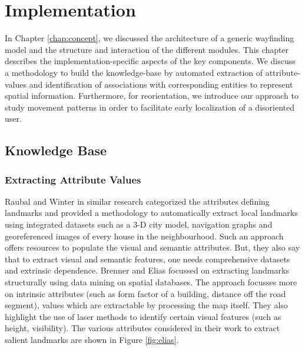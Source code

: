 \documentclass{iitkthesis}
\begin{document}
 \chapter{Implementation}
 \label{chap:implement}
In Chapter \ref{chap:concept}, we discussed the 
architecture of a generic wayfinding model and the structure and interaction 
of the different modules. This chapter describes the implementation-specific 
aspects of the key components. We discuss a methodology to build the 
knowledge-base by automated extraction of attribute-values and 
identification of associations with corresponding entities to 
represent spatial information. Furthermore, for reorientation, 
we introduce our approach to study movement patterns in order to 
facilitate early localization of a disoriented user.

 \section{Knowledge Base}
  \label{sec:kbase}
\subsection{Extracting Attribute Values}
Raubal and Winter \cite{raubal} in similar research categorized
the attributes defining landmarks and provided a methodology to 
automatically extract local landmarks using integrated datasets such as a
3-D city model, navigation graphs and georeferenced images of every house 
in the neighbourhood. Such an approach offers resources to populate the 
visual and semantic attributes. But, they also say that to extract 
visual and semantic features, one needs comprehensive datasets and 
extrinsic dependence.  Brenner and Elias \cite{brenner} focussed on 
extracting landmarks structurally using data mining on spatial 
databases. The approach focusses more on intrinsic attributes (such as 
form factor of a building, distance off the road segment), values 
which are extractable by processing the map itself. They also 
highlight the use of laser methods to identify certain visual features 
(such as height, visibility).  The various attributes considered in their 
work to extract salient landmarks are shown in Figure \ref{fig:elias}.
\end{document}
